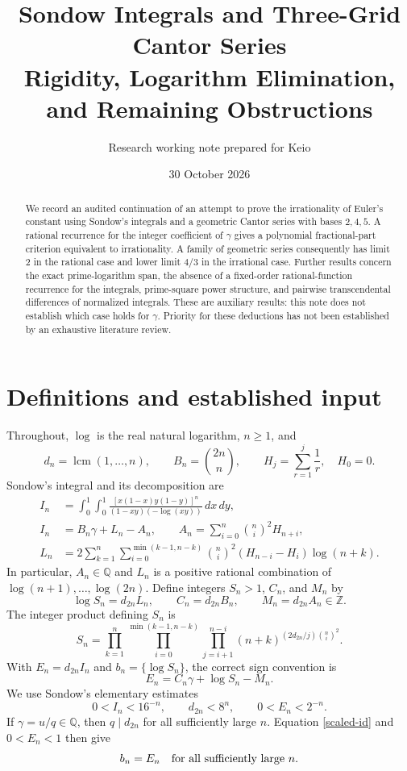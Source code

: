 \documentclass[11pt,a4paper]{article}
\title{Sondow Integrals and Three-Grid Cantor Series\\[3pt]
\large Rigidity, Logarithm Elimination, and Remaining Obstructions}
\author{Research working note prepared for Keio}
\date{30 October 2026}
\theoremstyle{remark}\newtheorem{remark}[theorem]{Remark}
\newcommand{\Q}{\mathbb Q}\newcommand{\Z}{\mathbb Z}
\newcommand{\fracpart}[1]{\{#1\}}
\begin{document}
\maketitle
\begin{abstract}
We record an audited continuation of an attempt to prove the irrationality of
Euler's constant using Sondow's integrals and a geometric Cantor series with
bases $2,4,5$. A rational recurrence for the integer coefficient of $\gamma$
gives a polynomial fractional-part criterion equivalent to irrationality. A
family of geometric series consequently has limit $2$ in the rational case and
lower limit $4/3$ in the irrational case. Further results concern the exact
prime-logarithm span, the absence of a fixed-order rational-function recurrence
for the integrals, prime-square power structure, and pairwise transcendental
differences of normalized integrals. These are auxiliary results: this note
does not establish which case holds for $\gamma$. Priority for these deductions
has not been established by an exhaustive literature review.
\end{abstract}

\section{Definitions and established input}
Throughout, $\log$ is the real natural logarithm, $n\ge1$, and
\[
 d_n=\operatorname{lcm}(1,\ldots,n),\qquad
 B_n=\binom{2n}{n},\qquad H_j=\sum_{r=1}^j\frac1r,\quad H_0=0.
\]
Sondow's integral and its decomposition are \cite{sondow}
\begin{align}
 I_n&=\int_0^1\!\int_0^1
 \frac{[x(1-x)y(1-y)]^n}{(1-xy)(-\log(xy))}\,dx\,dy,\label{integral}\\
 I_n&=B_n\gamma+L_n-A_n,\qquad
 A_n=\sum_{i=0}^n\binom ni^2H_{n+i},\label{sondow-id}\\
 L_n&=2\sum_{k=1}^n\sum_{i=0}^{\min(k-1,n-k)}
 \binom ni^2(H_{n-i}-H_i)\log(n+k).\label{log-form}
\end{align}
In particular, $A_n\in\Q$ and $L_n$ is a positive rational combination of
$\log(n+1),\ldots,\log(2n)$. Define integers $S_n>1$, $C_n$, and $M_n$ by
\[
 \log S_n=d_{2n}L_n,\qquad C_n=d_{2n}B_n,\qquad M_n=d_{2n}A_n\in\Z.
\]
The integer product defining $S_n$ is
\[
 S_n=\prod_{k=1}^n\prod_{i=0}^{\min(k-1,n-k)}
       \prod_{j=i+1}^{n-i}(n+k)^{(2d_{2n}/j)\binom ni^2}.
\]
With $E_n=d_{2n}I_n$ and $b_n=\fracpart{\log S_n}$, the correct sign convention is
\begin{equation}
 E_n=C_n\gamma+\log S_n-M_n.\label{scaled-id}
\end{equation}
We use Sondow's elementary estimates
\begin{equation}
 0<I_n<16^{-n},\qquad d_{2n}<8^n,\qquad 0<E_n<2^{-n}.\label{bounds}
\end{equation}
If $\gamma=u/q\in\Q$, then $q\mid d_{2n}$ for all sufficiently large $n$.
Equation \eqref{scaled-id} and $0<E_n<1$ then give
\begin{equation}
 b_n=E_n\quad\hbox{for all sufficiently large }n.\label{rational-case}
\end{equation}
\end{document}

